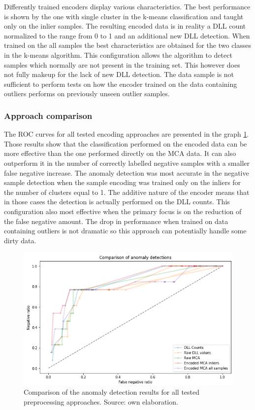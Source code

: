 \documentclass[a4paper,twoside,12pt]{book}
\begin{document}
Differently trained encoders display various characteristics. The best performance is shown by
the one with single cluster in the k-means classification and taught only on the inlier samples.
The resulting encoded data is in reality a DLL count normalized to the range from 0 to 1 and an
additional new DLL detection. When trained on the all samples the best characteristics are 
obtained for the two classes in the k-means algorithm. This configuration allows the algorithm
to detect samples which normally are not present in the training set. This however does not 
fully makeup for the lack of new DLL detection. The data sample is not sufficient to perform
tests on how the encoder trained on the data containing outliers performs on previously unseen
outlier samples.

\subsubsection{Approach comparison}

The ROC curves for all tested encoding approaches are presented in the graph \ref{fig:GraphComp}.
Those results show that the classification performed on the encoded data can be more effective
than the one performed directly on the MCA data. It can also outperform it in the number of 
correctly labelled negative samples with a smaller false negative increase. The anomaly 
detection was most accurate in the negative sample detection when the sample encoding was trained only on the inliers
for the number of clusters equal to 1. The additive nature of the encoder means that in those cases the 
detection is actually performed on the DLL counts. This configuration also most effective 
when the primary focus is on the reduction of the false negative amount. The drop in performance when 
trained on data containing outliers is not dramatic so this approach can potentially handle some 
dirty data.

\begin{figure}
	\centering
	\includegraphics[scale=0.9]{images/DLLCompGraphKF.PNG}
	\caption{Comparison of the anomaly detection results for all tested preprocessing approaches. Source: own elaboration.}
	\label{fig:GraphComp}
 \end{figure}
\end{document}
